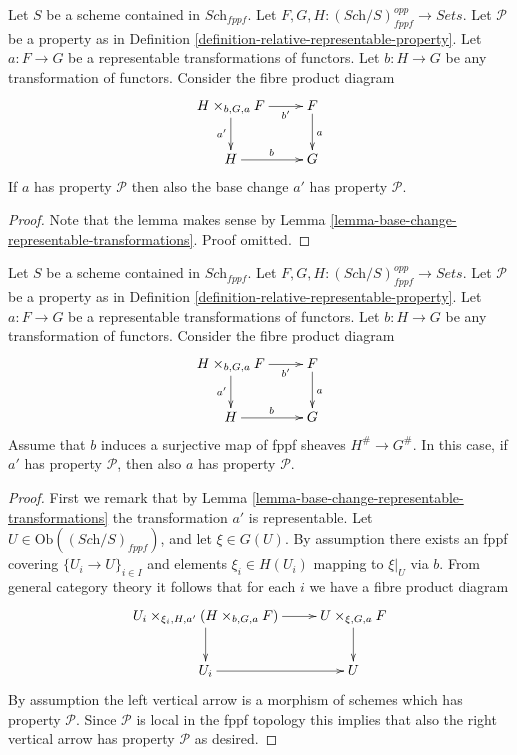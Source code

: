 \begin{lemma}
\label{lemma-base-change-representable-transformations-property}
Let $S$ be a scheme contained in $\textit{Sch}_{fppf}$.
Let $F, G, H : (\textit{Sch}/S)_{fppf}^{opp} \to \textit{Sets}$.
Let $\mathcal{P}$ be a property as in
Definition \ref{definition-relative-representable-property}.
Let $a : F \to G$ be a representable transformations of functors.
Let $b : H \to G$ be any transformation of functors.
Consider the fibre product diagram
$$
\xymatrix{
H \times_{b, G, a} F \ar[r]_-{b'} \ar[d]_{a'} & F \ar[d]^a \\
H \ar[r]^b & G
}
$$
If $a$ has property $\mathcal{P}$ then also the base change $a'$
has property $\mathcal{P}$.
\end{lemma}

\begin{proof}
Note that the lemma makes sense by
Lemma \ref{lemma-base-change-representable-transformations}.
Proof omitted.
\end{proof}

\begin{lemma}
\label{lemma-descent-representable-transformations-property}
Let $S$ be a scheme contained in $\textit{Sch}_{fppf}$.
Let $F, G, H : (\textit{Sch}/S)_{fppf}^{opp} \to \textit{Sets}$.
Let $\mathcal{P}$ be a property as in
Definition \ref{definition-relative-representable-property}.
Let $a : F \to G$ be a representable transformations of functors.
Let $b : H \to G$ be any transformation of functors.
Consider the fibre product diagram
$$
\xymatrix{
H \times_{b, G, a} F \ar[r]_-{b'} \ar[d]_{a'} & F \ar[d]^a \\
H \ar[r]^b & G
}
$$
Assume that $b$ induces a surjective map of fppf sheaves $H^\# \to G^\#$.
In this case, if $a'$ has property $\mathcal{P}$, then also $a$
has property $\mathcal{P}$.
\end{lemma}

\begin{proof}
First we remark that by
Lemma \ref{lemma-base-change-representable-transformations}
the transformation $a'$ is representable.
Let $U \in \text{Ob}((\textit{Sch}/S)_{fppf})$, and let
$\xi \in G(U)$. By assumption there exists an fppf covering
$\{U_i \to U\}_{i \in I}$ and elements $\xi_i \in H(U_i)$ mapping
to $\xi|_U$ via $b$. From general category theory it follows that for
each $i$ we have a fibre product diagram
$$
\xymatrix{
U_i \times_{\xi_i, H, a'} (H \times_{b, G, a} F) \ar[r] \ar[d] &
U \times_{\xi, G, a} F \ar[d] \\
U_i \ar[r] & U
}
$$
By assumption the left vertical arrow is a morphism of schemes which
has property $\mathcal{P}$. Since $\mathcal{P}$ is local in the fppf
topology this implies that also the right vertical arrow has property
$\mathcal{P}$ as desired.
\end{proof}

